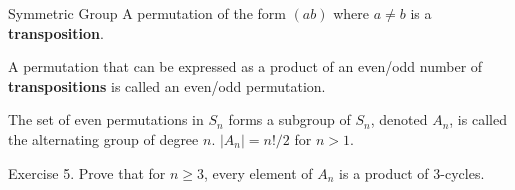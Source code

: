 \documentclass{beamer}
\begin{document}
\begin{frame}{Symmetric Group}
    \hh A permutation of the form $(ab)$ where $a \neq b$ is  a \textbf{transposition}.
    \par \vv
    \hh A permutation that can be expressed as a product of an even/odd number of \textbf{transpositions} is called an even/odd permutation. 
    \par \vv
    \hh The set of even permutations in $S_n$ forms a subgroup of $S_n$, denoted $A_n$, is called the alternating group of degree $n$.  $|A_n| = n!/2$ for $n > 1
    $.
\end{frame}

\begin{frame}{Exercise}
    5. Prove that for $n \geqslant 3$, every element of $A_n$ is a product of 3-cycles.
\end{frame}
\end{document}
